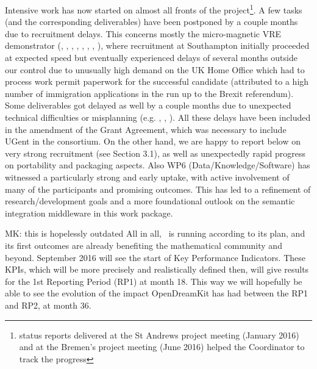 Intensive work has now started on almost all fronts of the
project\footnote{status reports delivered at the St Andrews project
  meeting (January 2016) and at the Bremen's project meeting (June
  2016) helped the Coordinator to track the progress}. A few tasks
(and the corresponding deliverables) have been postponed by a couple
months due to recruitment delays. This concerns mostly the
micro-magnetic VRE demonstrator
(,
,
,
,
,
,
,
), where recruitment
at Southampton initially proceeded at expected speed but eventually
experienced delays of several months outside our control due to unusually high demand on the UK Home
Office which had to process work permit paperwork for
the successful candidate (attributed to a high number of immigration applications in the run up to the
Brexit referendum). Some deliverables got
delayed as well by a couple months due to unexpected technical
difficulties or misplanning (e.g. ,
, ). All
these delays have been included in the amendment of the Grant
Agreement, which was necessary to include UGent in the
consortium. On the other hand, we are happy to report below on very
strong recruitment (see Section 3.1), as well as unexpectedly rapid
progress on portability and packaging aspects. Also WP6
(Data/Knowledge/Software) has witnessed a particularly strong and
early uptake, with active involvement of many of the participants and
promising outcomes. This has led to a refinement of research/development goals and a more
foundational outlook on the semantic integration middleware in this work package. 

\begin{oldpart}{MK: this is hopelessly outdated}
  All in all, \ODK\ is running according to its plan, and its first outcomes are already
  benefiting the mathematical community and beyond. September 2016 will see the start of
  Key Performance Indicators.  These KPIs, which will be more precisely and realistically
  defined then, will give results for the 1st Reporting Period (RP1) at month 18.  This
  way we will hopefully be able to see the evolution of the impact OpenDreamKit has had
  between the RP1 and RP2, at month 36.
\end{oldpart}



